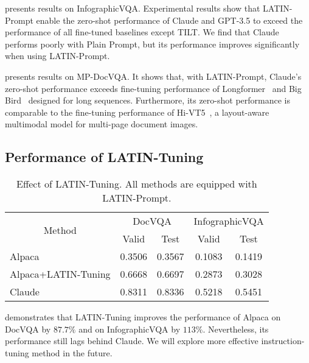 \documentclass[letterpaper]{article} \usepackage{aaai24_preprint}  \usepackage{times}  \usepackage{helvet}  \usepackage{courier}  \usepackage[hyphens]{url}  \usepackage{graphicx} \urlstyle{rm} \def\UrlFont{\rm}  \usepackage{natbib}  \usepackage{caption} \frenchspacing  \setlength{\pdfpagewidth}{8.5in} \setlength{\pdfpageheight}{11in} \usepackage{algorithm}
\begin{document}
 presents results on InfographicVQA.
Experimental results show that LATIN-Prompt enable the zero-shot performance of Claude and GPT-3.5 to exceed the performance of all fine-tuned baselines except TILT.
We find that Claude performs poorly with Plain Prompt, but its performance improves significantly when using LATIN-Prompt.

 presents results on MP-DocVQA.
It shows that, with LATIN-Prompt, Claude's zero-shot performance exceeds fine-tuning performance of Longformer~\cite{beltagyLongformer2020} and Big Bird~\cite{zaheerBigBirdTransformers2021} designed for long sequences.
Furthermore, its zero-shot performance is comparable to the fine-tuning performance of Hi-VT5~\cite{titoMulti-PageDocVQAHi-VT52023}, a layout-aware multimodal model for multi-page document images.

\subsection{Performance of LATIN-Tuning}
\begin{table}[t]
\small
\centering
\begin{tabular}{@{}lcccc@{}}
\toprule
\multicolumn{1}{c}{\multirow{2}{*}{Method}} & \multicolumn{2}{c}{DocVQA} & \multicolumn{2}{c}{InfographicVQA} \\
\multicolumn{1}{c}{}&Valid&Test&Valid&Test\\
\midrule
Alpaca&0.3506&0.3567&0.1083&0.1419\\
Alpaca+LATIN-Tuning&0.6668&0.6697&0.2873&0.3028\\
Claude&0.8311&0.8336&0.5218&0.5451\\
\bottomrule
\end{tabular}
\caption{
Effect of LATIN-Tuning. All methods are equipped with LATIN-Prompt.
}
\label{tab:exp_latin-tuning}
\end{table}
 demonstrates that LATIN-Tuning improves the performance of Alpaca on DocVQA by $87.7\%$ and on InfographicVQA by $113\%$.
Nevertheless, its performance still lags behind Claude.
We will explore more effective instruction-tuning method in the future.
\end{document}
